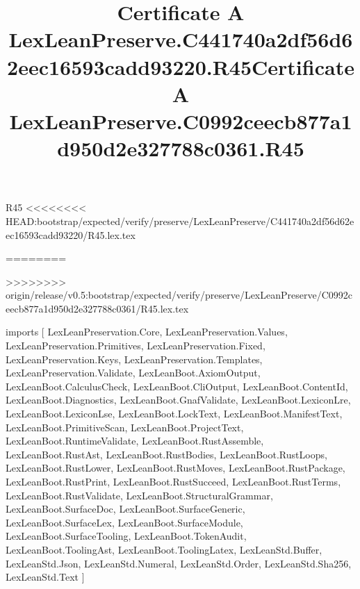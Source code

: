 \begin{lexlean}{R45}
<<<<<<<< HEAD:bootstrap/expected/verify/preserve/LexLeanPreserve/C441740a2df56d62eec16593cadd93220/R45.lex.tex
\title{Certificate A LexLeanPreserve.C441740a2df56d62eec16593cadd93220.R45}
========
\title{Certificate A LexLeanPreserve.C0992ceecb877a1d950d2e327788c0361.R45}
>>>>>>>> origin/release/v0.5:bootstrap/expected/verify/preserve/LexLeanPreserve/C0992ceecb877a1d950d2e327788c0361/R45.lex.tex
\begin{coremodule}
imports [
  LexLeanPreservation.Core,
  LexLeanPreservation.Values,
  LexLeanPreservation.Primitives,
  LexLeanPreservation.Fixed,
  LexLeanPreservation.Keys,
  LexLeanPreservation.Templates,
  LexLeanPreservation.Validate,
  LexLeanBoot.AxiomOutput,
  LexLeanBoot.CalculusCheck,
  LexLeanBoot.CliOutput,
  LexLeanBoot.ContentId,
  LexLeanBoot.Diagnostics,
  LexLeanBoot.GnafValidate,
  LexLeanBoot.LexiconLre,
  LexLeanBoot.LexiconLse,
  LexLeanBoot.LockText,
  LexLeanBoot.ManifestText,
  LexLeanBoot.PrimitiveScan,
  LexLeanBoot.ProjectText,
  LexLeanBoot.RuntimeValidate,
  LexLeanBoot.RustAssemble,
  LexLeanBoot.RustAst,
  LexLeanBoot.RustBodies,
  LexLeanBoot.RustLoops,
  LexLeanBoot.RustLower,
  LexLeanBoot.RustMoves,
  LexLeanBoot.RustPackage,
  LexLeanBoot.RustPrint,
  LexLeanBoot.RustSucceed,
  LexLeanBoot.RustTerms,
  LexLeanBoot.RustValidate,
  LexLeanBoot.StructuralGrammar,
  LexLeanBoot.SurfaceDoc,
  LexLeanBoot.SurfaceGeneric,
  LexLeanBoot.SurfaceLex,
  LexLeanBoot.SurfaceModule,
  LexLeanBoot.SurfaceTooling,
  LexLeanBoot.TokenAudit,
  LexLeanBoot.ToolingAst,
  LexLeanBoot.ToolingLatex,
  LexLeanStd.Buffer,
  LexLeanStd.Json,
  LexLeanStd.Numeral,
  LexLeanStd.Order,
  LexLeanStd.Sha256,
  LexLeanStd.Text
]


\end{coremodule}
\end{lexlean}
